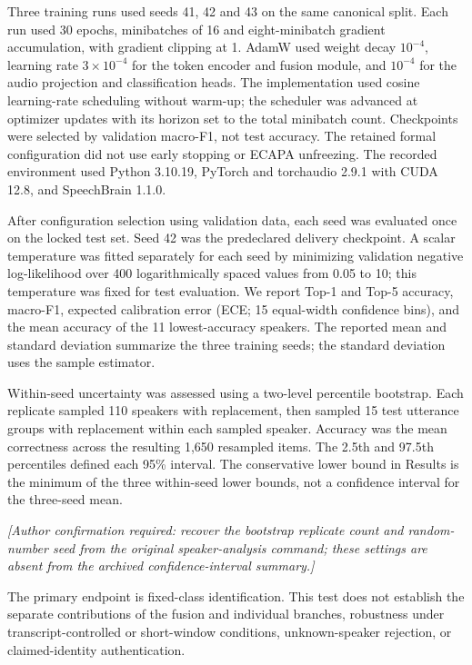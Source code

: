 Three training runs used seeds 41, 42 and 43 on the same canonical split. Each run used 30 epochs, minibatches of 16 and eight-minibatch gradient accumulation, with gradient clipping at 1. AdamW used weight decay $10^{-4}$, learning rate $3\times10^{-4}$ for the token encoder and fusion module, and $10^{-4}$ for the audio projection and classification heads. The implementation used cosine learning-rate scheduling without warm-up; the scheduler was advanced at optimizer updates with its horizon set to the total minibatch count. Checkpoints were selected by validation macro-F1, not test accuracy. The retained formal configuration did not use early stopping or ECAPA unfreezing. The recorded environment used Python 3.10.19, PyTorch and torchaudio 2.9.1 with CUDA 12.8, and SpeechBrain 1.1.0.

After configuration selection using validation data, each seed was evaluated once on the locked test set. Seed 42 was the predeclared delivery checkpoint. A scalar temperature was fitted separately for each seed by minimizing validation negative log-likelihood over 400 logarithmically spaced values from 0.05 to 10; this temperature was fixed for test evaluation. We report Top-1 and Top-5 accuracy, macro-F1, expected calibration error (ECE; 15 equal-width confidence bins), and the mean accuracy of the 11 lowest-accuracy speakers. The reported mean and standard deviation summarize the three training seeds; the standard deviation uses the sample estimator.

Within-seed uncertainty was assessed using a two-level percentile bootstrap. Each replicate sampled 110 speakers with replacement, then sampled 15 test utterance groups with replacement within each sampled speaker. Accuracy was the mean correctness across the resulting 1,650 resampled items. The 2.5th and 97.5th percentiles defined each 95\% interval. The conservative lower bound in Results is the minimum of the three within-seed lower bounds, not a confidence interval for the three-seed mean.

\noindent\textit{[Author confirmation required: recover the bootstrap replicate count and random-number seed from the original speaker-analysis command; these settings are absent from the archived confidence-interval summary.]}

The primary endpoint is fixed-class identification. This test does not establish the separate contributions of the fusion and individual branches, robustness under transcript-controlled or short-window conditions, unknown-speaker rejection, or claimed-identity authentication.

